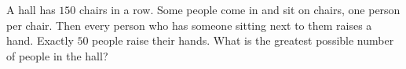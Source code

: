 A hall has $150$ chairs in a row. Some people come in and sit on chairs, one person per chair. Then every person who has someone sitting next to them raises a hand. Exactly $50$ people raise their hands. What is the greatest possible number of people in the hall?
